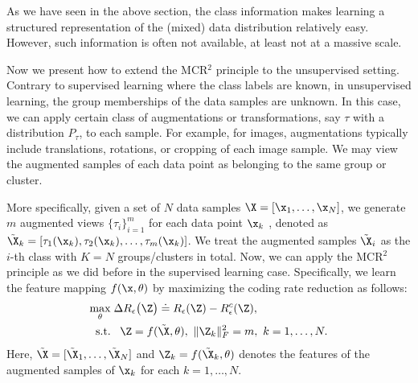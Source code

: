 \documentclass[../../book-main.tex]{subfiles}
\begin{document}
As we have seen in the above section, the class information makes learning a structured representation of the (mixed) data distribution relatively easy. However, such information is often not available, at least not at a massive scale. 

Now we present how to extend the MCR$^2$ principle to the unsupervised setting. Contrary to supervised learning where the class labels are known, in unsupervised learning, the group memberships of the data samples are unknown. In this case, we can apply certain class of augmentations or transformations, say $\tau$ with a distribution $P_{\tau}$, to each sample. For example, for images,  augmentations typically include translations, rotations, or cropping of each image sample. We may view the augmented samples of each data point as belonging to the same group or cluster. 

More specifically, given a set of $N$ data samples $\X = [\x_1,\dots,\x_N]$, we generate $m$ augmented views $\{\tau_i\}_{i=1}^m$ for each data point $\x_k$ , denoted as $\tilde{\X}_{k} = [\tau_1(\x_k), \tau_2(\x_k), \dots, \tau_m(\x_k)]$. We treat the augmented samples $\tilde{\X}_{i}$ as the $i$-th class with $K=N$ groups/clusters in total. Now, we can apply the MCR$^2$ principle as we did before in the supervised learning case. Specifically, we learn the feature mapping $f(\x,\theta)$ by maximizing the coding rate reduction as follows:
\begin{equation}
	\begin{aligned}
		\max_{\theta } & \;  \Delta R_{\epsilon}\big(\Z \big) \doteq R_{\epsilon}(\Z) - R_{\epsilon}^c(\Z ), \\
		\mbox{s.t.} & \ \ \, \Z = f(\tilde{\X}, \theta),\  \|\Z_k\|_F^2                                          = m,\ k=1,\dots,N. 
	\end{aligned}
	\label{eqn:maximal-rate-reduction-unsupervised}
\end{equation}
Here, $\tilde{\X} = [\tilde{\X}_1,\dots,\tilde{\X}_N]$ and $\Z_k = f(\tilde{\X}_k,\theta)$ denotes the features of the augmented samples of $\x_k$ for each $k=1,\dots,N$.
\end{document}
